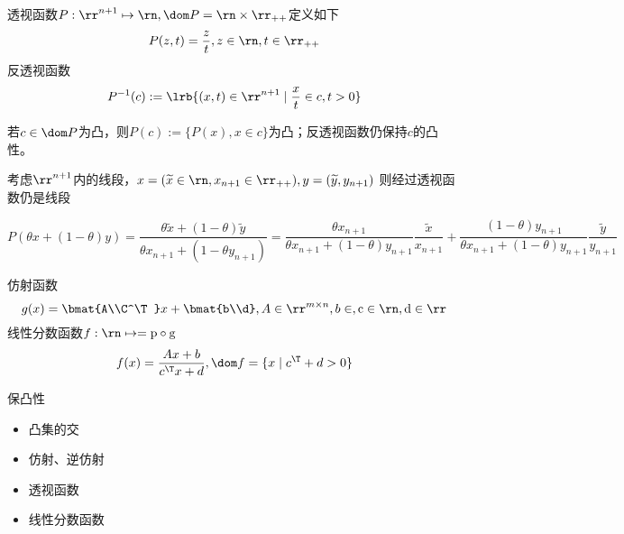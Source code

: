 \documentclass{note}
\begin{document}
\begin{definition}
透视函数$P:\rr^{n+1}\mapsto\rn,\dom P=\rn\times\rr_{++}$定义如下
\[P(z,t)=\dfrac{z}{t},z\in\rn,t\in\rr_{++}\]
反透视函数
\[P^{-1}(c):=\lrb{(x,t)\in\rr^{n+1}\mid\frac{x}{t}\in c,t>0}\]
\end{definition}

若$c\in\dom P$为凸，则$P(c):=\{P(x),x\in c\}$为凸；反透视函数仍保持$c$的凸性。

考虑$\rr^{n+1}$内的线段，$x=(\widetilde{x}\in\rn,x_{n+1}\in\rr_{++}),y=(\widetilde{y},y_{n+1})$
则经过透视函数仍是线段
\begin{analysis}
\[P(\theta x+(1-\theta)y)=\frac{\theta\widetilde{x}+(1-\theta)\widetilde{y}}{\theta x_{n+1}+(1-\theta y_{n+1})}=\frac{\theta x_{n+1}}{\theta x_{n+1}+(1-\theta)y_{n+1}}\frac{\widetilde{x}}{x_{n+1}}+\frac{(1-\theta)y_{n+1}}{\theta x_{n+1}+(1-\theta)y_{n+1}}\frac{\widetilde{y}}{y_{n+1}}\]
\end{analysis}

\begin{definition}[线性分数函数]
仿射函数
\[g(x)=\bmat{A\\C^\T}x+\bmat{b\\d},A\in\rr^{m\times n},b\in\rm,c\in\rn,d\in\rr\]
线性分数函数$f:\rn\mapsto\rm=p\circ g$
\[f(x)=\frac{Ax+b}{c^\T x+d},\dom f=\{x\mid c^\T+d>0\}\]
\end{definition}

保凸性
\begin{itemize}
	\item 凸集的交
	\item 仿射、逆仿射
	\item 透视函数
	\item 线性分数函数
\end{itemize}
\end{document}
